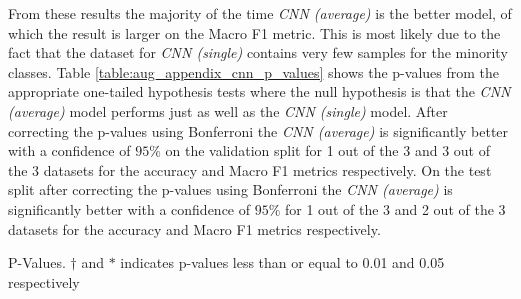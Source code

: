 From these results the majority of the time \textit{CNN (average)} is the better model, of which the result is larger on the Macro F1 metric. This is most likely due to the fact that the dataset for \textit{CNN (single)} contains very few samples for the minority classes. Table \ref{table:aug_appendix_cnn_p_values} shows the p-values from the appropriate one-tailed hypothesis tests where the null hypothesis is that the \textit{CNN (average)} model performs just as well as the \textit{CNN (single)} model. After correcting the p-values using Bonferroni the \textit{CNN (average)} is significantly better with a confidence of $95\%$ on the validation split for 1 out of the 3 and 3 out of the 3 datasets for the accuracy and Macro F1 metrics respectively. On the test split after correcting the p-values using Bonferroni the \textit{CNN (average)} is significantly better with a confidence of $95\%$ for 1 out of the 3 and 2 out of the 3 datasets for the accuracy and Macro F1 metrics respectively.

\begin{table}[ht!]
    \centering
    
    \caption{P-Values. $\dagger$ and $\ast$ indicates p-values less than or equal to 0.01 and 0.05 respectively }
    \label{table:aug_appendix_cnn_p_values}
\end{table}
